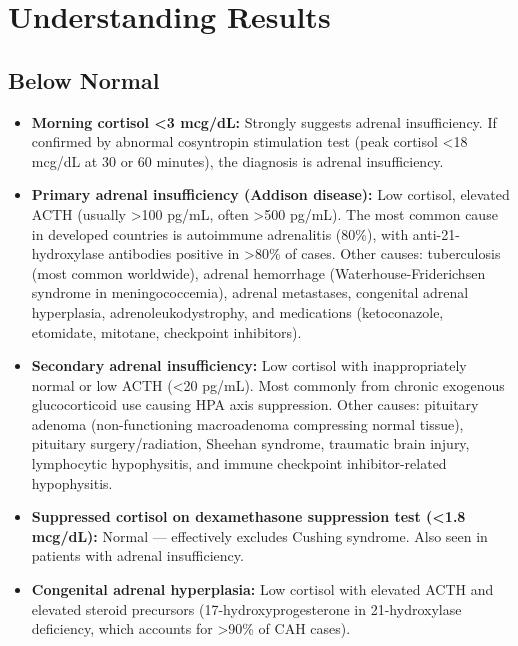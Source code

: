 \section*{Understanding Results}

\subsection*{Below Normal}
\begin{itemize}
  \item \textbf{Morning cortisol <3 mcg/dL:} Strongly suggests adrenal insufficiency. If confirmed by abnormal cosyntropin stimulation test (peak cortisol <18 mcg/dL at 30 or 60 minutes), the diagnosis is adrenal insufficiency.
  \item \textbf{Primary adrenal insufficiency (Addison disease):} Low cortisol, elevated ACTH (usually >100 pg/mL, often >500 pg/mL). The most common cause in developed countries is autoimmune adrenalitis (80\%), with anti-21-hydroxylase antibodies positive in >80\% of cases. Other causes: tuberculosis (most common worldwide), adrenal hemorrhage (Waterhouse-Friderichsen syndrome in meningococcemia), adrenal metastases, congenital adrenal hyperplasia, adrenoleukodystrophy, and medications (ketoconazole, etomidate, mitotane, checkpoint inhibitors).
  \item \textbf{Secondary adrenal insufficiency:} Low cortisol with inappropriately normal or low ACTH (<20 pg/mL). Most commonly from chronic exogenous glucocorticoid use causing HPA axis suppression. Other causes: pituitary adenoma (non-functioning macroadenoma compressing normal tissue), pituitary surgery/radiation, Sheehan syndrome, traumatic brain injury, lymphocytic hypophysitis, and immune checkpoint inhibitor-related hypophysitis.
  \item \textbf{Suppressed cortisol on dexamethasone suppression test (<1.8 mcg/dL):} Normal --- effectively excludes Cushing syndrome. Also seen in patients with adrenal insufficiency.
  \item \textbf{Congenital adrenal hyperplasia:} Low cortisol with elevated ACTH and elevated steroid precursors (17-hydroxyprogesterone in 21-hydroxylase deficiency, which accounts for >90\% of CAH cases).
\end{itemize}

